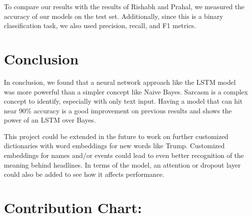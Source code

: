 \documentclass[11pt]{article}
\begin{document}
To compare our results with the results of Rishabh and Prahal,
we measured the accuracy of our models on the test set.
Additionally, since this is a binary classification task,
we also used precision, recall, and F1 metrics.




\section{Conclusion}

In conclusion, we found that a neural network approach like the LSTM model was more powerful than a simpler concept like Naive Bayes. Sarcasm is a complex concept to identify, especially with only text input. Having a model that can hit near 90\% accuracy is a good improvement on previous results and shows the power of an LSTM over Bayes.

This project could be extended in the future to work on further customized dictionaries with word embeddings for new words like Trump. Customized embeddings for names and/or events could lead to even better recognition of the meaning behind headlines. In terms of the model, an attention or dropout layer could also be added to see how it affects performance.

\section{Contribution Chart:}
\end{document}
